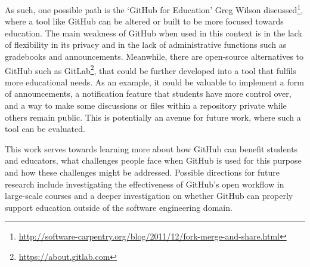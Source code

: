 As such, one possible path is the `GitHub for Education' Greg Wilson discussed\footnote{\url{http://software-carpentry.org/blog/2011/12/fork-merge-and-share.html}}, where a tool like GitHub can be altered or built to be more focused towards education. The main weakness of GitHub when used in this context is in the lack of flexibility in its privacy and in the lack of administrative functions such as gradebooks and announcements. Meanwhile, there are open-source alternatives to GitHub such as GitLab\footnote{\url{https://about.gitlab.com}}, that could be further developed into a tool that fulfils more educational needs. As an example, it could be valuable to implement a form of announcements, a notification feature that students have more control over, and a way to make some discussions or files within a repository private while others remain public. This is potentially an avenue for future work, where such a tool can be evaluated.

This work serves towards learning more about how GitHub can benefit students and educators, what challenges people face when GitHub is used for this purpose and how these challenges might be addressed. Possible directions for future research include investigating the effectiveness of GitHub's open workflow in large-scale courses and a deeper investigation on whether GitHub can properly support education outside of the software engineering domain.


